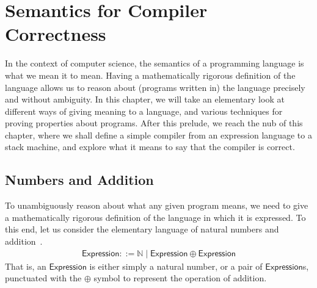 
\def\prod{\mathrel{::=}}
\def\altn{\mathrel{\mid}}
\def\NT#1{\mathsf{#1}}
\def\Nat{\mathbb{N}}
\def\Expression{\NT{Expression}}

\chapter{Semantics for Compiler Correctness}


In the context of computer science, the semantics of a programming language
is what we mean it to mean. Having a mathematically rigorous definition of
the language allows us to reason about (programs written in) the language
precisely and without ambiguity. In this chapter, we will take an elementary
look at different ways of giving meaning to a language, and various
techniques for proving properties about programs. After this prelude, we
reach the nub of this chapter, where we shall define a simple compiler from
an expression language to a stack machine, and explore what it means to say
that the compiler is correct.


\section{Numbers and Addition}%

To unambiguously reason about what any given program means, we need to give
a mathematically rigorous definition of the language in which it is
expressed. To this end, let us consider the elementary language of natural
numbers and
addition~\cite{hutton04-exceptions,hutton06-calculating,hutton07-interruptions}.
\begin{gather*}
	\Expression \prod \Nat \altn \Expression \oplus \Expression
\end{gather*}
That is, an $\Expression$ is either simply a natural number, or a pair of
$\Expression$s, punctuated with the $\oplus$ symbol to represent the
operation of addition.

